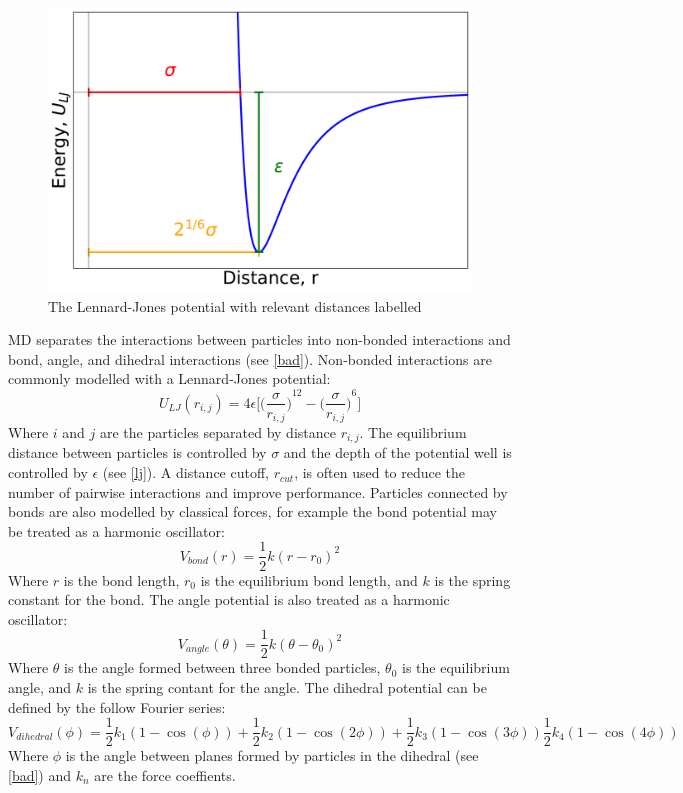 \begin{figure}
    \begin{center}
        \includegraphics[width=\linewidth]{images/lj.pdf}
        \end{center}
    \caption{The Lennard-Jones potential with relevant distances labelled}\label{lj}
\end{figure}
MD separates the interactions between particles into non-bonded interactions and bond, angle, and dihedral interactions (see \autoref{bad}).
Non-bonded interactions are commonly modelled with a Lennard-Jones potential:
\[
    U_{LJ}(r_{i,j}) = 4\epsilon\big[
        {\big(\frac{\sigma}{r_{i,j}}\big)}^{12}-
        {\big(\frac{\sigma}{r_{i,j}}\big)}^{6}
        \big]
\]
Where $i$ and $j$ are the particles separated by distance $r_{i,j}$.
The equilibrium distance between particles is controlled by $\sigma$ and the depth of the potential well is controlled by $\epsilon$ (see \autoref{lj}).
A distance cutoff, $r_{cut}$, is often used to reduce the number of pairwise interactions and improve performance.
Particles connected by bonds are also modelled by classical forces, for example the bond potential may be treated as a harmonic oscillator:
\[
    V_{bond}{(r)} = \frac{1}{2}k{(r-r_{0})}^{2}
\]
Where $r$ is the bond length, $r_{0}$ is the equilibrium bond length, and $k$ is the spring constant for the bond.
The angle potential is also treated as a harmonic oscillator:
\[
    V_{angle}{(\theta)}=\frac{1}{2}k{(\theta-\theta_{0})}^{2}
\]
Where $\theta$ is the angle formed between three bonded particles, $\theta_{0}$ is the equilibrium angle, and $k$ is the spring contant for the angle.
The dihedral potential can be defined by the follow Fourier series:
\[
    V_{dihedral}(\phi)=\frac{1}{2}k_{1}(1-\cos(\phi))+\frac{1}{2}k_{2}(1-\cos(2\phi))+\frac{1}{2}k_{3}(1-\cos(3\phi))\frac{1}{2}k_{4}(1-\cos(4\phi))
\]
Where $\phi$ is the angle between planes formed by particles in the dihedral (see \autoref{bad}) and $k_{n}$ are the force coeffients.

